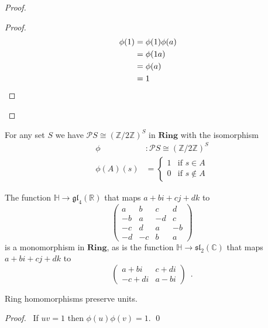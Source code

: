 \begin{proof}
\pf
{}
\begin{proof}
\pf
\begin{align*}
\phi(1) & = \phi(1) \phi(a) \\
& = \phi(1a) \\
& = \phi(a) \\
& = 1 & \qed
\end{align*}
\end{proof}
\end{proof}

\begin{ex}
For any set $S$ we have $\mathcal{P} S \cong (\mathbb{Z} / 2 \mathbb{Z})^S$ in $\mathbf{Ring}$ with the isomorphism
\begin{align*}
\phi & : \mathcal{P} S \cong (\mathbb{Z} / 2 \mathbb{Z})^S \\
\phi(A)(s) & = \begin{cases}
1 & \text{if } s \in A \\
0 & \text{if } s \notin A
\end{cases}
\end{align*}
\end{ex}

\begin{ex}
The function $\mathbb{H} \rightarrow \mathfrak{gl}_4(\mathbb{R})$ that maps $a + bi + cj + dk$ to
\[ \left( \begin{array}{cccc}
a & b & c & d \\
-b & a & -d & c \\
-c & d & a & -b \\
-d & -c & b & a
\end{array} \right) \]
is a monomorphism in $\mathbf{Ring}$, as is the function $\mathbb{H} \rightarrow \mathfrak{sl}_2(\mathbb{C})$ that maps $a + bi + cj + dk$ to
\[ \left( \begin{array}{cc}
a + bi & c + di \\
-c + di & a - bi
\end{array} \right) \enspace . \]
\end{ex}

\begin{prop}
Ring homomorphisms preserve units.
\end{prop}

\begin{proof}
\pf\ If $uv = 1$ then $\phi(u) \phi(v) = 1$. \qed
\end{proof}

